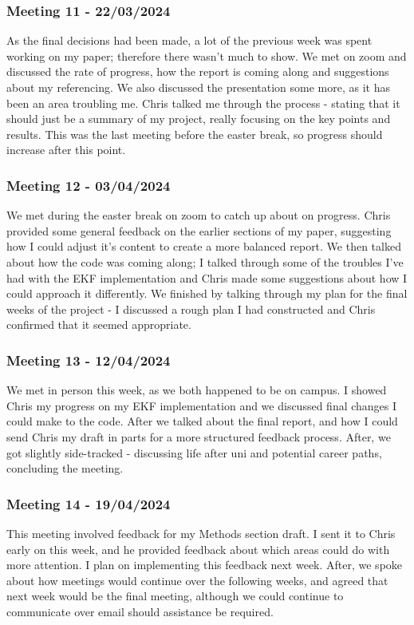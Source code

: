 \documentclass[12pt]{article}
\begin{document}
\subsubsection{Meeting 11 - 22/03/2024}
As the final decisions had been made, a lot of the previous week was spent working on my paper; therefore there wasn't much to show.
We met on zoom and discussed the rate of progress, how the report is coming along and suggestions about my referencing. We also
discussed the presentation some more, as it has been an area troubling me. Chris talked me through the process - stating that it should
just be a summary of my project, really focusing on the key points and results. This was the last meeting before the easter break, so
progress should increase after this point.
\subsubsection{Meeting 12 - 03/04/2024}
We met during the easter break on zoom to catch up about on progress. Chris provided some general feedback on the earlier sections
of my paper, suggesting how I could adjust it's content to create a more balanced report. We then talked about how the code was
coming along; I talked through some of the troubles I've had with the EKF implementation and Chris made some suggestions about
how I could approach it differently. We finished by talking through my plan for the final weeks of the project - I discussed a rough
plan I had constructed and Chris confirmed that it seemed appropriate.
\subsubsection{Meeting 13 - 12/04/2024}
We met in person this week, as we both happened to be on campus. I showed Chris my progress on my EKF implementation and we discussed
final changes I could make to the code. After we talked about the final report, and how I could send Chris my draft in parts for a more
structured feedback process. After, we got slightly side-tracked - discussing life after uni and potential career paths, concluding
the meeting.\\
\subsubsection{Meeting 14 - 19/04/2024}
This meeting involved feedback for my Methods section draft. I sent it to Chris early on this week, and he provided feedback about which areas
could do with more attention. I plan on implementing this feedback next week. After, we spoke about how meetings would continue over the
following weeks, and agreed that next week would be the final meeting, although we could continue to communicate over email should assistance
be required.\\
\end{document}
